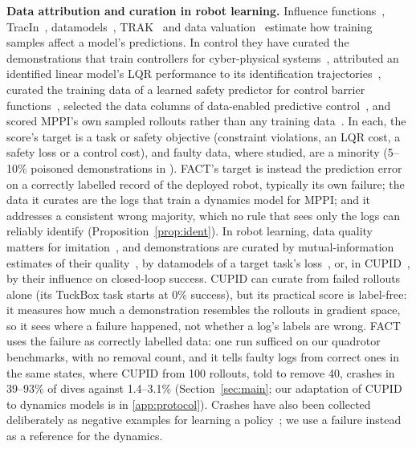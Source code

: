 \documentclass[preprint,12pt]{elsarticle}
\newcommand{\method}{FACT}
\begin{document}
\textbf{Data attribution and curation in robot learning.} Influence functions~\citep{koh2017influence}, TracIn~\citep{pruthi2020tracin}, datamodels~\citep{ilyas2022datamodels}, TRAK~\citep{park2023trak} and data valuation~\citep{ghorbani2019shapley} estimate how training samples affect a model's predictions. In control they have curated the demonstrations that train controllers for cyber-physical systems~\citep{ifcps2026}, attributed an identified linear model's LQR performance to its identification trajectories~\citep{lqrinfluence2026}, curated the training data of a learned safety predictor for control barrier functions~\citep{dacbf2026}, selected the data columns of data-enabled predictive control~\citep{dmdeepc2025}, and scored MPPI's own sampled rollouts rather than any training data~\citep{dmmppi2025}. In each, the score's target is a task or safety objective (constraint violations, an LQR cost, a safety loss or a control cost), and faulty data, where studied, are a minority (5--10\% poisoned demonstrations in \citet{ifcps2026}). \method{}'s target is instead the prediction error on a correctly labelled record of the deployed robot, typically its own failure; the data it curates are the logs that train a dynamics model for MPPI; and it addresses a consistent wrong majority, which no rule that sees only the logs can reliably identify (Proposition~\ref{prop:ident}). In robot learning, data quality matters for imitation~\citep{belkhale2023dataquality}, and demonstrations are curated by mutual-information estimates of their quality~\citep{hejna2025demInf}, by datamodels of a target task's loss~\citep{dass2025datamil}, or, in CUPID~\citep{agia2025cupid}, by their influence on closed-loop success. CUPID can curate from failed rollouts alone (its TuckBox task starts at 0\% success), but its practical score is label-free: it measures how much a demonstration resembles the rollouts in gradient space, so it sees where a failure happened, not whether a log's labels are wrong. \method{} uses the failure as correctly labelled data: one run sufficed on our quadrotor benchmarks, with no removal count, and it tells faulty logs from correct ones in the same states, where CUPID from 100 rollouts, told to remove 40, crashes in 39--93\% of dives against 1.4--3.1\% (Section~\ref{sec:main}; our adaptation of CUPID to dynamics models is in \ref{app:protocol}). Crashes have also been collected deliberately as negative examples for learning a policy~\citep{gandhi2017crashing}; we use a failure instead as a reference for the dynamics.
\end{document}
